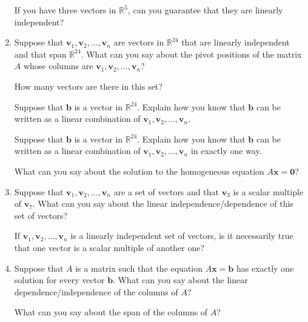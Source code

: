 \documentclass[12pt]{article}
\newcommand{\vs}[1]{\vspace{#1in}}
\newcommand{\bvec}{{\mathbf b}}
\newcommand{\vvec}{{\mathbf v}}
\newcommand{\xvec}{{\mathbf x}}
\newcommand{\zerovec}{{\mathbf 0}}
\newcommand{\real}{{\mathbb R}}
\begin{document}
\begin{enumerate}
  \vs{1}

  If you have three vectors in $\real^5$, can you guarantee that they
  are linearly independent?

  \vs{1}

\item Suppose that $\vvec_1, \vvec_2, \ldots, \vvec_n$ are vectors in
  $\real^{24}$ that are linearly independent and that span $\real^{24}$.
  What can you say about the pivot positions of the matrix $A$ whose
  columns are $\vvec_1, \vvec_2, \ldots, \vvec_n$?

  \vs{1.5}
  How many vectors are there in this set?

  \vs{1}
  Suppose that $\bvec$ is a vector in $\real^{24}$.  Explain how you
  know that $\bvec$ can be written as a linear combination of
  $\vvec_1,\vvec_2, \ldots,\vvec_n$.

  \vs{1}
  Suppose that $\bvec$ is a vector in $\real^{24}$.  Explain how you
  know that $\bvec$ can be written as a linear combination of
  $\vvec_1,\vvec_2, \ldots,\vvec_n$ in exactly one way.

  \vs{1}
  What can you say about the solution to the homogeneous equation
  $A\xvec = \zerovec$?
  
  \vs{1}
\item Suppose that $\vvec_1,\vvec_2,\ldots,\vvec_n$ are a set of
  vectors and that $\vvec_3$ is a scalar multiple of $\vvec_7$.  What
  can you say about the linear independence/dependence of this set of
  vectors?

  \vs{1}
  If $\vvec_1,\vvec_2,\ldots,\vvec_n$ is a linearly independent set of
  vectors, is it necessarily true that one vector is a scalar multiple
  of another one?

  \vs{1}
\item Suppose that $A$ is a matrix such that the equation
  $A\xvec=\bvec$ has exactly one solution for every vector $\bvec$.
  What can you say about the linear dependence/independence of the
  columns of $A$?

  \vs{1}
  What can you say about the span of the columns of $A$?


    

  

\end{enumerate}
\end{document}
